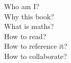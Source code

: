 Who am I?\\
Why this book?\\
What is maths?\\
How to read?\\
How to reference it?\\
How to collaborate?

